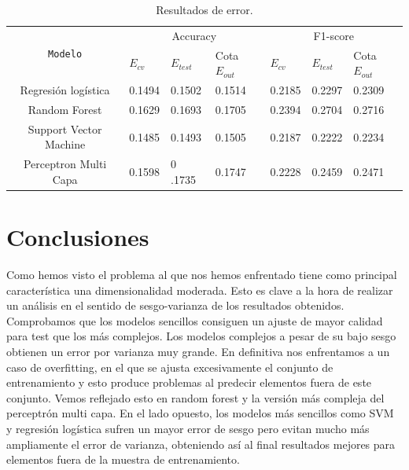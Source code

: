\documentclass[11pt,a4paper]{article}
\begin{document}
\begin{table}[h]
  \begin{center}

\begin{tabular}{|c| lll| lll|}
\hline
  \multirow{2}{*}{\texttt{Modelo}} &     \multicolumn{3}{c|}{Accuracy}  &      \multicolumn{3}{c|}{F1-score} \\
          & $E_{cv}$&$E_{test}$& Cota $E_{out}$ &$E_{cv}$&$E_{test}$& Cota $E_{out}$ \\
\hline

  Regresión logística & 0.1494 & 0.1502 & 0.1514 & 0.2185 & 0.2297 & 0.2309 \\
  Random Forest & 0.1629 & 0.1693 & 0.1705 & 0.2394 & 0.2704 &0.2716 \\
  Support Vector Machine & 0.1485 & 0.1493 & 0.1505 & 0.2187 & 0.2222 & 0.2234 \\
  Perceptron Multi Capa & 0.1598 & 0 .1735 &0.1747 & 0.2228 & 0.2459 &0.2471  \\\hline

\end{tabular}
\end{center}
\caption{Resultados de error.}
\label{tab:table-name-error} 
\end{table}



\newpage
\section{ Conclusiones }
Como hemos visto el problema al que nos hemos enfrentado tiene como principal característica una dimensionalidad moderada. Esto es clave a la hora de realizar un análisis en el sentido de sesgo-varianza de los resultados obtenidos. Comprobamos que los modelos sencillos consiguen un ajuste de mayor calidad para test que los más complejos. Los modelos complejos a pesar de su bajo sesgo obtienen un error por varianza muy grande. En definitiva nos enfrentamos a un caso de overfitting, en el que se ajusta excesivamente el conjunto de entrenamiento y esto produce problemas al predecir elementos fuera de este conjunto. Vemos reflejado esto en random forest y la versión más compleja del perceptrón multi capa. En el lado opuesto, los modelos más sencillos como SVM y regresión logística sufren un mayor error de sesgo pero evitan mucho más ampliamente el error de varianza, obteniendo así al final resultados mejores para elementos fuera de la muestra de entrenamiento. \\
\end{document}
